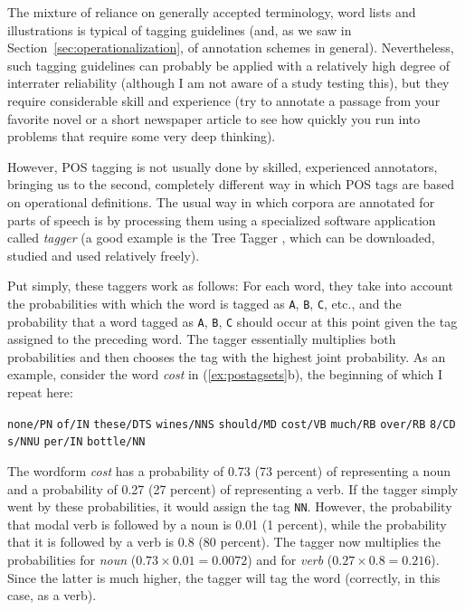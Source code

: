 The mixture of reliance on generally accepted terminology, word lists and illustrations is typical of tagging  guidelines (and, as we saw in Section~\ref{sec:operationalization},  of annotation  schemes in general). Nevertheless, such tagging  guidelines can probably be applied with a relatively high degree of interrater  reliability (although I am not aware of a study testing this), but they require considerable skill and experience (try to annotate  a passage from your favorite novel  or a short newspaper article  to see how quickly you run into problems that require some very deep thinking).

However, POS tagging  is not usually done by skilled, experienced annotators,  bringing us to the second, completely different way in which POS tags are based on operational  definitions. The usual way in which corpora are annotated  for parts of speech is by processing them using a specialized software application called \textit{tagger} (a good example is the Tree Tagger \citep{schmid_probabilistic_1994}, which can be downloaded, studied and used relatively freely).

Put simply, these taggers  work as follows: For each word, they take into account the probabilities  with which the word is tagged as \texttt{A}, \texttt{B}, \texttt{C}, etc., and the probability that a word tagged as \texttt{A}, \texttt{B}, \texttt{C} should occur at this point given the tag assigned to the preceding word. The tagger essentially multiplies both probabilities and then chooses the tag with the highest joint probability. As an example, consider the word \textit{cost} in (\ref{ex:postagsets}b), the beginning of which I repeat here:

\begin{exe}
\ex \begin{minipage}[t]{0.85\textwidth} \raggedright \texttt{none/PN} \texttt{of/IN} \texttt{these/DTS} \texttt{wines/NNS} \texttt{should/MD} \texttt{cost/VB} \texttt{much/RB} \texttt{over/RB} \texttt{8/CD} \texttt{s/NNU} \texttt{per/IN} \texttt{bottle/NN} \end{minipage}
\label{ex:shouldcost}
\end{exe}

The wordform \textit{cost} has a probability  of 0.73 (73 percent) of representing a noun  and a probability of 0.27 (27 percent) of representing a verb.  If the tagger  simply went by these probabilities, it would assign the tag \texttt{NN}. However, the probability that modal verb is followed by a noun is 0.01 (1 percent), while the probability that it is followed by a verb is 0.8 (80 percent). The tagger  now multiplies the probabilities for \textit{noun} ($0.73 \times 0.01 = 0.0072$) and for \textit{verb} ($0.27 \times 0.8 = 0.216$). Since the latter is much higher, the tagger  will tag the word (correctly, in this case, as a  verb).

